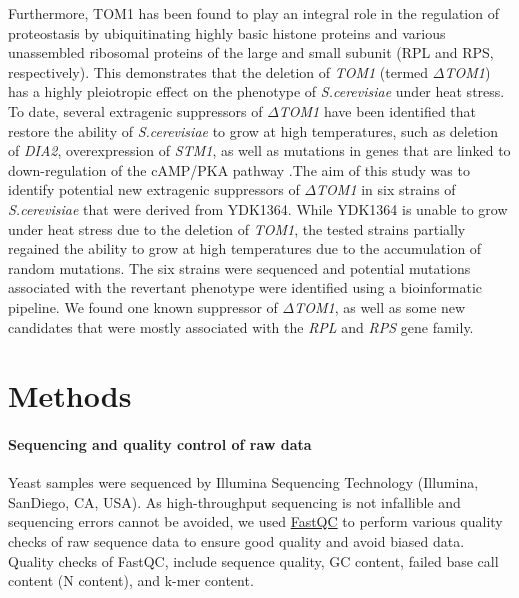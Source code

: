 \documentclass[10pt,a4paper]{article}
\begin{document}
\noindent Furthermore, TOM1 has been found to play an integral role in the regulation of proteostasis by ubiquitinating highly basic histone proteins \cite{singh_histone_2009} and various unassembled ribosomal proteins of the large and small subunit (RPL and RPS, respectively)\cite{sung_conserved_2016}. This demonstrates that the deletion of \textit{TOM1} (termed \textit{$\Delta$TOM1}) has a highly pleiotropic effect on the phenotype of \textit{S.cerevisiae} under heat stress. To date, several extragenic suppressors of \textit{$\Delta$TOM1} have been identified that restore the ability of  \textit{S.cerevisiae} to grow at high temperatures, such as deletion of \textit{DIA2}\cite{kim_hect_2012}, overexpression of \textit{STM1}\cite{utsugi_high_1995}, as well as mutations in genes that are linked to down-regulation of the cAMP/PKA pathway \cite{sasaki_extragenic_2000}.The aim of this study was to identify potential new extragenic suppressors of \textit{$\Delta$TOM1} in six strains of  \textit{S.cerevisiae} that were derived from YDK1364. While YDK1364 is unable to grow under heat stress due to the deletion of \textit{TOM1}, the tested strains partially regained the ability to grow at high temperatures due to the accumulation of random mutations. The six strains were sequenced and potential mutations associated with the revertant phenotype were identified using a bioinformatic pipeline. We found one known suppressor of \textit{$\Delta$TOM1}, as well as some new candidates that were mostly associated with the \textit{RPL} and \textit{RPS} gene family. \\



\section*{\large Methods}

\paragraph{Sequencing and quality control of raw data} Yeast samples were sequenced by Illumina Sequencing Technology (Illumina, SanDiego, CA, USA). As high-throughput sequencing is not infallible and sequencing errors cannot be avoided, we used \href{http://www.bioinformatics.babraham.ac.uk/projects/fastqc/}{FastQC} to perform various quality checks of raw sequence data to ensure good quality and avoid biased data. Quality checks of FastQC, include sequence quality, GC content, failed base call content (N content), and k-mer content.
\end{document}
